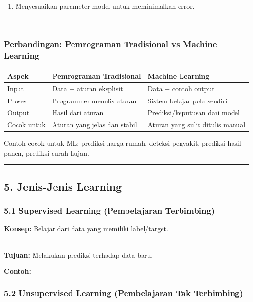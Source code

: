 \documentclass[12pt,a4paper]{article}
\begin{document}
\begin{enumerate}
\item Menyesuaikan parameter model untuk meminimalkan error.
\end{enumerate}


\\[
\text{Error} = y - \hat{y}
\\]


\subsubsection{Perbandingan: Pemrograman Tradisional vs Machine Learning}

\begin{tabular}{|l|l|l|}
\hline
Aspek & Pemrograman Tradisional & Machine Learning \\
\hline
Input & Data + aturan eksplisit & Data + contoh output \\
\hline
Proses & Programmer menulis aturan & Sistem belajar pola sendiri \\
\hline
Output & Hasil dari aturan & Prediksi/keputusan dari model \\
\hline
Cocok untuk & Aturan yang jelas dan stabil & Aturan yang sulit ditulis manual \\
\hline
\end{tabular}


Contoh cocok untuk ML: prediksi harga rumah, deteksi penyakit, prediksi hasil panen, prediksi curah hujan.


\hrule


\subsection{5. Jenis-Jenis Learning}

\subsubsection{5.1 Supervised Learning (Pembelajaran Terbimbing)}

\textbf{Konsep:} Belajar dari data yang memiliki label/target.


\\[
(X, y) \rightarrow \text{Model} \rightarrow \hat{y}
\\]


\textbf{Tujuan:} Melakukan prediksi terhadap data baru.


\textbf{Contoh:}


\subsubsection{5.2 Unsupervised Learning (Pembelajaran Tak Terbimbing)}
\end{document}
